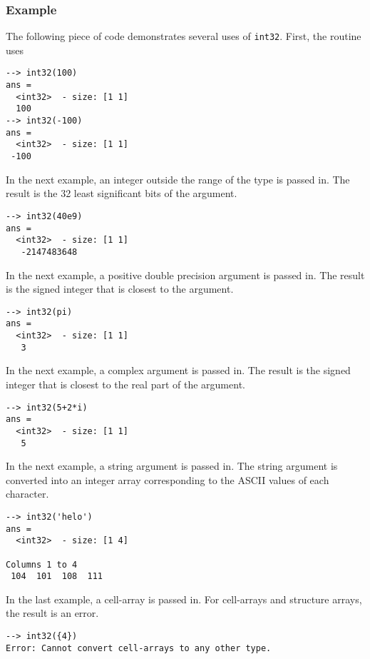 \subsubsection{Example}
The following piece of code demonstrates several uses of \verb|int32|.  First, the routine uses
\begin{verbatim}
--> int32(100)
ans =
  <int32>  - size: [1 1]
  100
--> int32(-100)
ans =
  <int32>  - size: [1 1]
 -100
\end{verbatim}
In the next example, an integer outside the range  of the type is passed in.  The result is the 32 least significant bits of the argument.
\begin{verbatim}
--> int32(40e9)
ans =
  <int32>  - size: [1 1]
   -2147483648
\end{verbatim}
In the next example, a positive double precision argument is passed in.  The result is the signed integer that is closest to the argument.
\begin{verbatim}
--> int32(pi)
ans =
  <int32>  - size: [1 1]
   3
\end{verbatim}
In the next example, a complex argument is passed in.  The result is the signed integer that is closest to the real part of the argument.
\begin{verbatim}
--> int32(5+2*i)
ans =
  <int32>  - size: [1 1]
   5
\end{verbatim}
In the next example, a string argument is passed in.  The string argument is converted into an integer array corresponding to the ASCII values of each character.
\begin{verbatim}
--> int32('helo')
ans =
  <int32>  - size: [1 4]
  
Columns 1 to 4
 104  101  108  111
\end{verbatim}
In the last example, a cell-array is passed in.  For cell-arrays and structure arrays, the result is an error.
\begin{verbatim}
--> int32({4})
Error: Cannot convert cell-arrays to any other type.
\end{verbatim}
